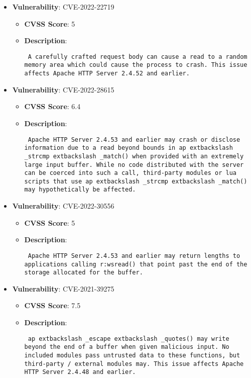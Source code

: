 \documentclass{article}
\begin{document}
\begin{itemize}
        \item \textbf{Vulnerability}: CVE-2022-22719
        \begin{itemize}
            \item \textbf{CVSS Score}:  5 
            \item \textbf{Description}: \parbox{\linewidth}{\texttt{ A carefully crafted request body can cause a read to a random memory area which could cause the process to crash. This issue affects Apache HTTP Server 2.4.52 and earlier. }}
        \end{itemize}
    
        \item \textbf{Vulnerability}: CVE-2022-28615
        \begin{itemize}
            \item \textbf{CVSS Score}:  6.4 
            \item \textbf{Description}: \parbox{\linewidth}{\texttt{ Apache HTTP Server 2.4.53 and earlier may crash or disclose information due to a read beyond bounds in ap	extbackslash _strcmp	extbackslash _match() when provided with an extremely large input buffer. While no code distributed with the server can be coerced into such a call, third-party modules or lua scripts that use ap	extbackslash _strcmp	extbackslash _match() may hypothetically be affected. }}
        \end{itemize}
    
        \item \textbf{Vulnerability}: CVE-2022-30556
        \begin{itemize}
            \item \textbf{CVSS Score}:  5 
            \item \textbf{Description}: \parbox{\linewidth}{\texttt{ Apache HTTP Server 2.4.53 and earlier may return lengths to applications calling r:wsread() that point past the end of the storage allocated for the buffer. }}
        \end{itemize}
    
        \item \textbf{Vulnerability}: CVE-2021-39275
        \begin{itemize}
            \item \textbf{CVSS Score}:  7.5 
            \item \textbf{Description}: \parbox{\linewidth}{\texttt{ ap	extbackslash _escape	extbackslash _quotes() may write beyond the end of a buffer when given malicious input. No included modules pass untrusted data to these functions, but third-party / external modules may. This issue affects Apache HTTP Server 2.4.48 and earlier. }}
        \end{itemize}
    
\end{itemize}
\end{document}
